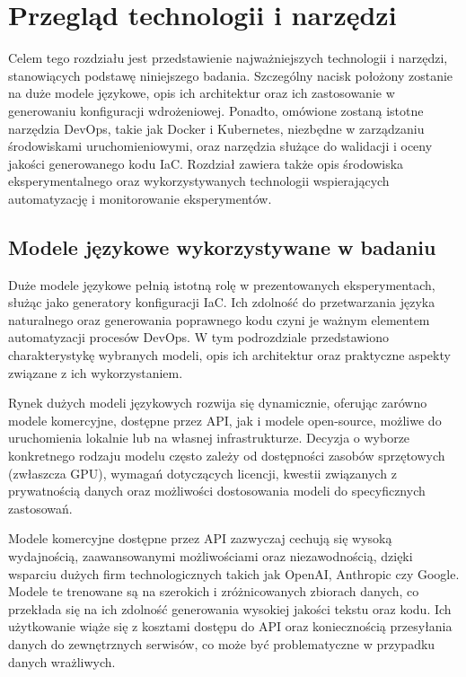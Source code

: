 \clearpage %

\section{Przegląd technologii i narzędzi}

Celem tego rozdziału jest przedstawienie najważniejszych technologii i narzędzi, stanowiących podstawę niniejszego badania. Szczególny nacisk położony zostanie na duże modele językowe, opis ich architektur oraz ich zastosowanie w generowaniu konfiguracji wdrożeniowej. Ponadto, omówione zostaną istotne narzędzia DevOps, takie jak Docker i Kubernetes, niezbędne w zarządzaniu środowiskami uruchomieniowymi, oraz narzędzia służące do walidacji i oceny jakości generowanego kodu IaC. Rozdział zawiera także opis środowiska eksperymentalnego oraz wykorzystywanych technologii wspierających automatyzację i monitorowanie eksperymentów.

\subsection{Modele językowe wykorzystywane w badaniu}

Duże modele językowe pełnią istotną rolę w prezentowanych eksperymentach, służąc jako generatory konfiguracji IaC. Ich zdolność do przetwarzania języka naturalnego oraz generowania poprawnego kodu czyni je ważnym elementem automatyzacji procesów DevOps. W tym podrozdziale przedstawiono charakterystykę wybranych modeli, opis ich architektur oraz praktyczne aspekty związane z ich wykorzystaniem.

Rynek dużych modeli językowych rozwija się dynamicznie, oferując zarówno modele komercyjne, dostępne przez API, jak i modele open-source, możliwe do uruchomienia lokalnie lub na własnej infrastrukturze. Decyzja o wyborze konkretnego rodzaju modelu często zależy od dostępności zasobów sprzętowych (zwłaszcza GPU), wymagań dotyczących licencji, kwestii związanych z prywatnością danych oraz możliwości dostosowania modeli do specyficznych zastosowań.

Modele komercyjne dostępne przez API zazwyczaj cechują się wysoką wydajnością, zaawansowanymi możliwościami oraz niezawodnością, dzięki wsparciu dużych firm technologicznych takich jak OpenAI, Anthropic czy Google. Modele te trenowane są na szerokich i zróżnicowanych zbiorach danych, co przekłada się na ich zdolność generowania wysokiej jakości tekstu oraz kodu. Ich użytkowanie wiąże się z kosztami dostępu do API oraz koniecznością przesyłania danych do zewnętrznych serwisów, co może być problematyczne w przypadku danych wrażliwych.

